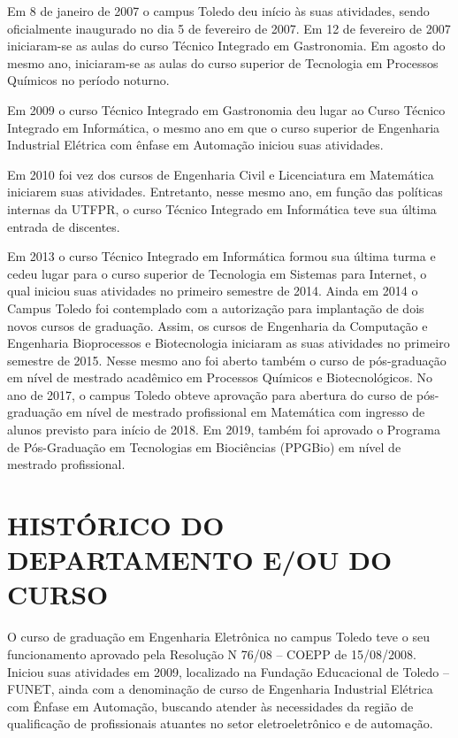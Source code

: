 Em 8 de janeiro de 2007 o campus Toledo deu início às suas atividades, sendo oficialmente inaugurado no dia 5 de fevereiro de 2007. Em 12 de fevereiro de 2007 iniciaram-se as aulas do curso Técnico Integrado em Gastronomia. Em agosto do mesmo ano, iniciaram-se as aulas do curso superior de Tecnologia em Processos Químicos no período noturno.

Em 2009 o curso Técnico Integrado em Gastronomia deu lugar ao Curso Técnico Integrado em Informática, o mesmo ano em que o curso superior de Engenharia Industrial Elétrica com ênfase em Automação iniciou suas atividades.

Em 2010 foi vez dos cursos de Engenharia Civil e Licenciatura em Matemática iniciarem suas atividades. Entretanto, nesse mesmo ano, em função das políticas internas da UTFPR, o curso Técnico Integrado em Informática teve sua última entrada de discentes.

Em 2013 o curso Técnico Integrado em Informática formou sua última turma e cedeu lugar para o curso superior de Tecnologia em Sistemas para Internet, o qual iniciou suas atividades no primeiro semestre de 2014. Ainda em 2014 o Campus Toledo foi contemplado com a autorização para implantação de dois novos cursos de graduação. Assim, os cursos de Engenharia da Computação e Engenharia Bioprocessos e Biotecnologia iniciaram as suas atividades no primeiro semestre de 2015. Nesse mesmo ano foi aberto também o curso de pós-graduação em nível de mestrado acadêmico em Processos Químicos e Biotecnológicos. No ano de 2017, o campus Toledo obteve aprovação para abertura do curso de pós-graduação em nível de mestrado profissional em Matemática com ingresso de alunos previsto para início de 2018. Em 2019, também foi aprovado o Programa de Pós-Graduação em Tecnologias em Biociências (PPGBio) em nível de mestrado profissional.


\section{HISTÓRICO DO DEPARTAMENTO E/OU DO CURSO}

O curso de graduação em Engenharia Eletrônica no campus Toledo teve o seu funcionamento aprovado pela Resolução N\textordmasculine{} 76/08 – COEPP de 15/08/2008. Iniciou suas atividades em 2009, localizado na Fundação Educacional de Toledo – FUNET, ainda com a denominação de curso de Engenharia Industrial Elétrica com Ênfase em Automação, buscando atender às necessidades da região de qualificação de profissionais atuantes no setor eletroeletrônico e de automação.

